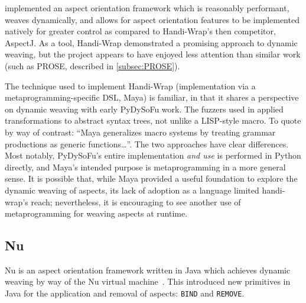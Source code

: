 \citeauthor{Baker_2002} implemented an aspect orientation framework which is
reasonably performant, weaves dynamically, and allows for aspect orientation
features to be implemented natively for greater control as compared to
Handi-Wrap's then competitor, AspectJ. As a tool, Handi-Wrap demonstrated a
promising approach to dynamic weaving, but the project appears to have enjoyed
less attention than similar work (such as PROSE, described in
\cref{subsec:PROSE}).

The technique used to implement Handi-Wrap (implementation via a
metaprogramming-specific DSL, Maya) is familiar, in that it shares a perspective
on dynamic weaving with early PyDySoFu work. The fuzzers used in
\cite{wallis2018caise} applied transformations to abstract syntax trees, not
unlike a LISP-style macro. To quote \cite{baker2002maya} by way of contrast:
``{\ttfamily{}Maya generalizes macro systems by treating grammar productions as
generic functions\ldots{}}''. The two
approaches have clear differences. Most notably, PyDySoFu's entire
implementation \emph{and use} is performed in Python directly, and Maya's
intended purpose is metaprogramming in a more general sense. It is possible
that, while Maya provided a useful foundation to explore the dynamic weaving of
aspects, its lack of adoption as a language limited handi-wrap's reach;
nevertheless, it is encouraging to see another use of metaprogramming for
weaving aspects at runtime.

\subsection{Nu}

Nu is an aspect orientation framework written in Java which achieves dynamic
weaving by way of the Nu virtual machine~\cite{dyerNUmasters}. This introduced
new primitives in Java for the application and removal of aspects:
\lstinline{BIND} and \lstinline{REMOVE}.

